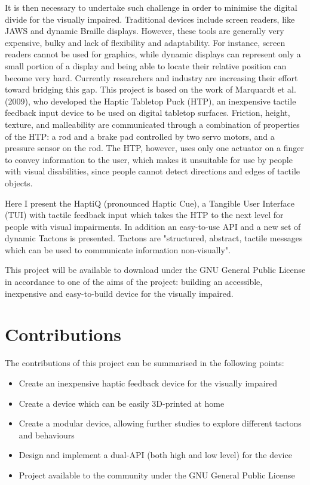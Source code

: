 It is then necessary to undertake such challenge in order to minimise the digital divide for the visually impaired. Traditional devices include screen readers, like JAWS\cite{JAWS} and dynamic Braille displays\cite{HumanWare, shimada2010development, blindMaps}. However, these tools are generally very expensive, bulky and lack of flexibility and adaptability. For instance, screen readers cannot be used for graphics, while dynamic displays can represent only a small portion of a display and being able to locate their relative position can become very hard.
Currently researchers and industry are increasing their effort toward bridging this gap. This project is based on the work of Marquardt et al.(2009)\nocite{marquardt2009haptic}, who developed the Haptic Tabletop Puck (HTP), an inexpensive tactile feedback input device to be used on digital tabletop surfaces. Friction, height, texture, and malleability are communicated through a combination of properties of the HTP: a rod and a brake pad controlled by two servo motors, and a pressure sensor on the rod. The HTP, however, uses only one actuator on a finger to convey information to the user, which makes it unsuitable for use by people with visual disabilities, since people cannot detect directions and edges of tactile objects. \par

Here I present the HaptiQ (pronounced Haptic Cue), a Tangible User Interface (TUI)\cite{ishii1997tangible} with tactile feedback input which takes the HTP to the next level for people with visual impairments. In addition an easy-to-use API and a new set of dynamic Tactons is presented. Tactons are "structured, abstract, tactile messages which can be used to communicate information non-visually"\cite{brown2005first}.\par
This project will be available to download under the GNU General Public License in accordance to one of the aims of the project: building an accessible, inexpensive and easy-to-build device for the visually impaired. \par

\section{Contributions}

The contributions of this project can be summarised in the following points:
\begin{itemize}
	\item Create an inexpensive haptic feedback device for the visually impaired
    \item Create a device which can be easily 3D-printed at home
    \item Create a modular device, allowing further studies to explore different tactons and behaviours
    \item Design and implement a dual-API (both high and low level) for the device
    \item Project available to the community under the GNU General Public License 
\end{itemize}


